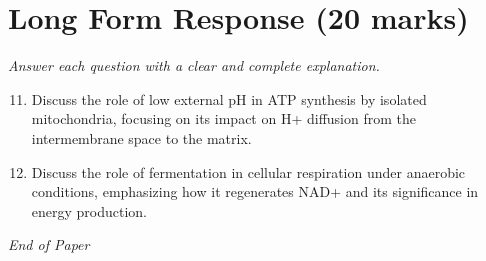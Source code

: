\documentclass[12pt]{article}
\begin{document}
\section*{Long Form Response (20 marks)}
\textit{Answer each question with a clear and complete explanation.}
\begin{enumerate}[label=\arabic*.]
\setcounter{enumi}{10}
\item Discuss the role of low external pH in ATP synthesis by isolated mitochondria, focusing on its impact on H+ diffusion from the intermembrane space to the matrix.
\item Discuss the role of fermentation in cellular respiration under anaerobic conditions, emphasizing how it regenerates NAD+ and its significance in energy production.
\end{enumerate}

\vfill
\noindent\textit{End of Paper}
\end{document}
